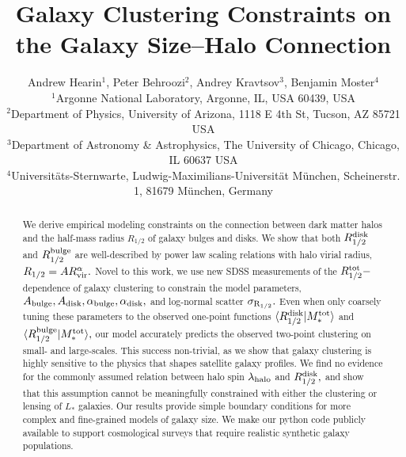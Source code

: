 \documentclass[usenatbib,usegraphicx,letterpaper]{mn2e}
\newcommand{\rhalf}{R_{1/2}}
\newcommand{\rhalftot}{R^{\rm tot}_{1/2}}
\newcommand{\rhalfdisk}{R_{1/2}^{\rm disk}}
\newcommand{\rhalfbulge}{R_{1/2}^{\rm bulge}}
\newcommand{\sigmarhalf}{\sigma_{\rm R_{1/2}}}
\newcommand{\rvir}{R_{\rm vir}}
\newcommand{\mstartot}{M^{\rm tot}_{\ast}}
\newcommand{\halospin}{\lambda_{\rm halo}}
\begin{document}
\title[The Galaxy Size--Halo Connection]
{Galaxy Clustering Constraints on the Galaxy Size--Halo Connection}


\author[Hearin, Behroozi, Kravtsov \& Moster]{
Andrew Hearin$^{1}$, Peter Behroozi$^{2}$, Andrey Kravtsov$^{3}$, Benjamin Moster$^{4}$\\
$^{1}$Argonne National Laboratory, Argonne, IL, USA 60439, USA\\
$^{2}$Department of Physics, University of Arizona, 1118 E 4th St, Tucson, AZ 85721 USA\\
$^{3}$Department of Astronomy \& Astrophysics, The University of Chicago, Chicago, IL 60637 USA\\
$^{4}$Universit{\"a}ts-Sternwarte, Ludwig-Maximilians-Universit{\"a}t M{\"u}nchen, Scheinerstr. 1, 81679 M{\"u}nchen, Germany
}

\maketitle

\begin{abstract}
We derive empirical modeling constraints on the connection between dark matter halos and the half-mass radius $\rhalf$ of galaxy bulges and disks. We show that both $\rhalfdisk$ and $\rhalfbulge$ are well-described by power law scaling relations with halo virial radius, $\rhalf=A\rvir^{\alpha}.$ Novel to this work, we use new SDSS measurements of the $\rhalftot-$dependence of galaxy clustering to constrain the model parameters, $A_{\rm bulge}, A_{\rm disk}, \alpha_{\rm bulge},\alpha_{\rm disk},$ and log-normal scatter $\sigmarhalf.$ Even when only coarsely tuning these parameters to the observed one-point functions $\langle\rhalfdisk\vert\mstartot\rangle$ and $\langle\rhalfbulge|\mstartot\rangle,$ our model accurately predicts the observed two-point clustering on small- and large-scales. This success non-trivial, as we show that galaxy clustering is highly sensitive to the physics that shapes satellite galaxy profiles. We find no evidence for the commonly assumed relation between halo spin $\halospin$ and $\rhalfdisk,$ and show that this assumption cannot be meaningfully constrained with either the clustering or lensing of  $L_{\ast}$ galaxies. Our results provide simple boundary conditions for more complex and fine-grained models of galaxy size. We make our python code publicly available to support cosmological surveys that require realistic synthetic galaxy populations.
\end{abstract}
\end{document}
